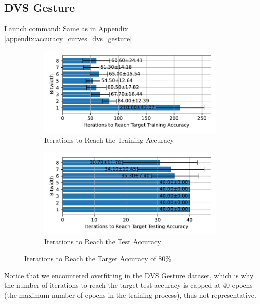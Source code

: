     \subsection{DVS Gesture}
    \label{appendix:iterations_dvs_gesture}
        Launch command: Same as in Appendix \ref{appendix:accuracy_curves_dvs_gesture}
        \begin{figure}[H]
            \centering
            \begin{subfigure}[H]{0.6\textwidth}
                \centering
                \includegraphics[width=\textwidth]{../standard/DVSGesture/plots/dvsgesture_train_iters_horizontal.pdf}
                \caption{Iterations to Reach the Training Accuracy}
            \end{subfigure}
            \hfill
            \begin{subfigure}[H]{0.6\textwidth}
                \centering
                \includegraphics[width=\textwidth]{../standard/DVSGesture/plots/dvsgesture_test_iters_horizontal.pdf}
                \caption{Iterations to Reach the Test Accuracy}
            \end{subfigure}
            \caption{Iterations to Reach the Target Accuracy of 80\%}
        \end{figure}

    Notice that we encountered overfitting in the DVS Gesture dataset, which is why the number of iterations to reach the target test accuracy is capped at 40 epochs (the maximum number of epochs in the training process), thus not representative. 

